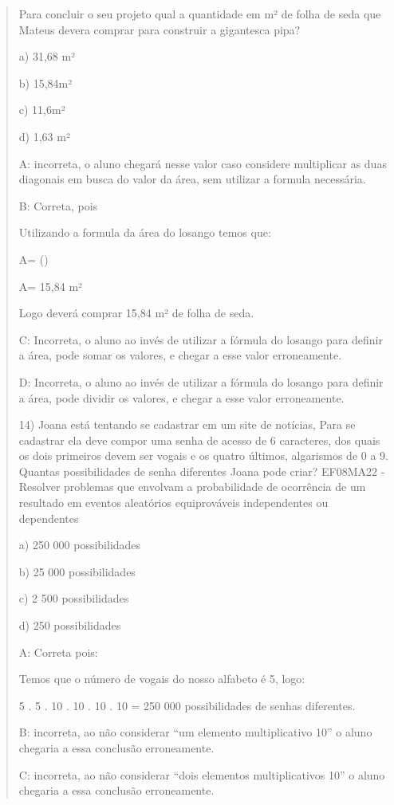 \begin{quote}
\begin{escolha}
Para concluir o seu projeto qual a quantidade em m² de folha de seda que
Mateus devera comprar para construir a gigantesca pipa?

a) 31,68 m²

b) 15,84m²

c) 11,6m²

d) 1,63 m²

A: incorreta, o aluno chegará nesse valor caso considere multiplicar as
duas diagonais em busca do valor da área, sem utilizar a formula
necessária.

B: Correta, pois

Utilizando a formula da área do losango temos que:


A= ()

A= 15,84 m²

Logo deverá comprar 15,84 m² de folha de seda.

C: Incorreta, o aluno ao invés de utilizar a fórmula do losango para
definir a área, pode somar os valores, e chegar a esse valor
erroneamente.

D: Incorreta, o aluno ao invés de utilizar a fórmula do losango para
definir a área, pode dividir os valores, e chegar a esse valor
erroneamente.

14) Joana está tentando se cadastrar em um site de notícias, Para se
cadastrar ela deve compor uma senha de acesso de 6 caracteres, dos quais
os dois primeiros devem ser vogais e os quatro últimos, algarismos de 0
a 9. Quantas possibilidades de senha diferentes Joana pode criar?
EF08MA22 - Resolver problemas que envolvam a probabilidade de ocorrência
de um resultado em eventos aleatórios equiprováveis independentes ou
dependentes

a) 250 000 possibilidades

b) 25 000 possibilidades

c) 2 500 possibilidades

d) 250 possibilidades

A: Correta pois:

Temos que o número de vogais do nosso alfabeto é 5, logo:

5 . 5 . 10 . 10 . 10 . 10 = 250 000 possibilidades de senhas diferentes.

B: incorreta, ao não considerar ``um elemento multiplicativo 10'' o
aluno chegaria a essa conclusão erroneamente.

C: incorreta, ao não considerar ``dois elementos multiplicativos 10'' o
aluno chegaria a essa conclusão erroneamente.


\end{escolha}
\end{quote}
